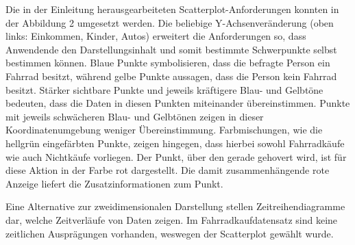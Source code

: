 \documentclass[usegeometry=true]{scrartcl}
\begin{document}
\newline Die in der Einleitung herausgearbeiteten Scatterplot-Anforderungen konnten in der Abbildung 2 umgesetzt werden. Die beliebige Y-Achsenveränderung (oben links: Einkommen, Kinder, Autos) erweitert die Anforderungen so, dass Anwendende den Darstellungsinhalt und somit bestimmte Schwerpunkte selbst bestimmen können. Blaue Punkte symbolisieren, dass die befragte Person ein Fahrrad besitzt, während gelbe Punkte aussagen, dass die Person kein Fahrrad besitzt. Stärker sichtbare Punkte und jeweils kräftigere Blau- und Gelbtöne bedeuten, dass die Daten in diesen Punkten miteinander übereinstimmen. Punkte mit jeweils schwächeren Blau- und Gelbtönen zeigen in dieser Koordinatenumgebung weniger Übereinstimmung. Farbmischungen, wie die hellgrün eingefärbten Punkte, zeigen hingegen, dass hierbei sowohl Fahrradkäufe wie auch Nichtkäufe vorliegen. Der Punkt, über den gerade gehovert wird, ist für diese Aktion in der Farbe rot dargestellt. Die damit zusammenhängende rote Anzeige liefert die Zusatzinformationen zum Punkt.

Eine Alternative zur zweidimensionalen Darstellung stellen Zeitreihendiagramme dar, welche Zeitverläufe von Daten zeigen. Im Fahrradkaufdatensatz sind keine zeitlichen Ausprägungen vorhanden, weswegen der Scatterplot gewählt wurde.
\end{document}
